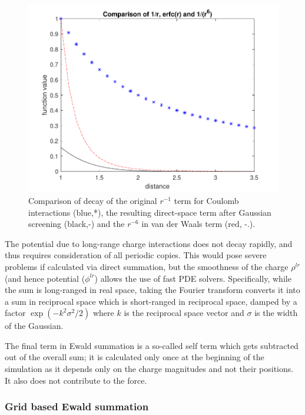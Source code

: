 \documentclass[9pt,bestpractices]{livecoms}
\begin{document}
\begin{figure}[h]
\centering
\includegraphics[width=\linewidth]{decay_comparison.pdf}
    \caption{Comparison of decay of the original $r^{-1}$ term for Coulomb interactions (blue,*), the resulting direct-space term after Gaussian screening (black,-) and the $r^{-6}$ in van der Waals term (red, -.).  }
\label{decay}
\end{figure}


The potential due to long-range charge interactions does not decay rapidly, and thus requires consideration of all periodic copies.
This would pose severe problems if calculated via direct summation, but the smoothness of the charge $\rho^{lr}$ (and hence potential ($\phi^{lr}$) allows the use of fast PDE solvers.
Specifically, while the sum is long-ranged in real space, taking the Fourier transform converts it into a sum in reciprocal space which is short-ranged in reciprocal space, damped by a factor $\exp\left(-k^2 \sigma^2/2\right)$ where $k$ is the reciprocal space vector and $\sigma$ is the width of the Gaussian.

The final term in Ewald summation is a so-called self term which gets subtracted out of the overall sum; it is calculated only once at the beginning of the simulation as it depends only on the charge magnitudes and not their positions.
It also does not contribute to the force.


\subsubsection{Grid based Ewald summation}
\end{document}
